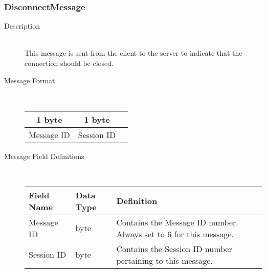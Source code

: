 \documentclass[12pt,letterpaper,titlepage]{article}
\begin{document}
\subsubsection{DisconnectMessage}
	\begin{description}
	\item[Description] \hfill \\
		This message is sent from the client to the server to indicate that the connection should be closed.
	\item[Message Format] \hfill \\
	\begin{tabular}{ | c | c | c | }
		\hline
		1 byte & 1 byte \\
		\hline
		Message ID & Session ID \\
		\hline
	\end{tabular}
	\item[Message Field Definitions] \hfill \\
	\begin{tabular}{ | p{3cm} | p{1.5cm} | p{8cm} | }
		\hline
		Field Name & Data Type & Definition \\
		\hline
		Message ID & byte & Contains the Message ID number. 
					\newline Always set to 6 for this message. \\
		\hline
		Session ID & byte & Contains the Session ID number pertaining to this message. \\
		\hline
	\end{tabular}
	\end{description}
\end{document}

